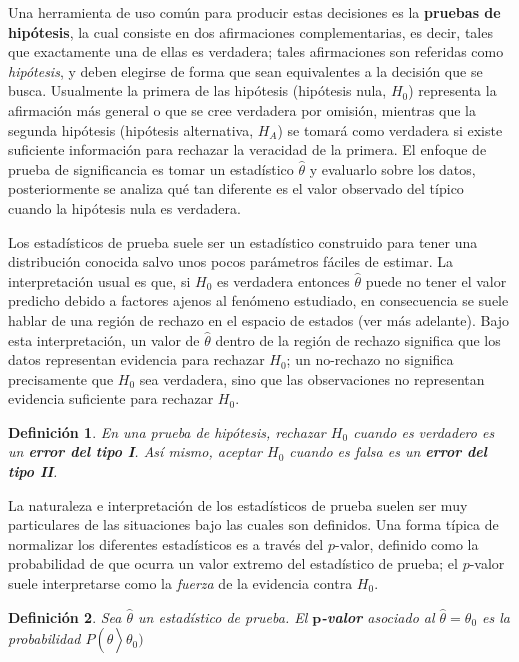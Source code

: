 \documentclass[12pt,letterpaper]{book}
\newtheorem{definicion}{Definición}[chapter]
\newcommand{\est}[1]{\widehat{ #1 }}
\begin{document}
Una herramienta de uso común para producir estas decisiones es la \textbf{pruebas de hipótesis},
la cual consiste en dos afirmaciones complementarias, es decir, tales que exactamente una de ellas es verdadera; tales afirmaciones
son referidas como \textit{hipótesis}, y deben elegirse de forma que sean equivalentes a la 
decisión que se busca. 
%
Usualmente la primera de las hipótesis (hipótesis nula, $H_0$) representa la afirmación más general o que se cree verdadera por omisión, mientras que la segunda hipótesis (hipótesis alternativa, $H_A$) se tomará como verdadera si
existe suficiente información para rechazar la veracidad de la primera.
%
El enfoque de prueba de significancia es  tomar un estadístico $\est{\theta}$ y evaluarlo sobre los datos, posteriormente se analiza qué tan diferente es el valor observado del típico cuando la hipótesis nula es verdadera.

Los estadísticos de prueba suele ser un estadístico construido para tener una distribución conocida salvo unos pocos parámetros fáciles de estimar.
%
La interpretación usual es que, si $H_0$ es verdadera entonces $\est{\theta}$ puede no tener el valor predicho debido a factores ajenos al fenómeno estudiado, en consecuencia se suele hablar de una región de rechazo en el espacio de estados (ver más adelante).
%
Bajo esta interpretación, un valor de $\widehat{\theta}$ dentro de la región de rechazo significa que los datos representan evidencia para rechazar $H_0$; un no-rechazo no significa precisamente que $H_0$ sea verdadera, sino que las observaciones no representan evidencia suficiente para rechazar $H_0$.

\begin{definicion}
En una prueba de hipótesis, rechazar $H_0$ cuando es verdadero es un \textbf{error del tipo I}. Así mismo, aceptar $H_0$ cuando es falsa es un \textbf{error del tipo II}.
\end{definicion}

La naturaleza e interpretación de los estadísticos de prueba suelen ser muy particulares de las situaciones bajo las cuales son definidos.
%
Una forma típica de normalizar los diferentes estadísticos es a través del $p$-valor, definido como la probabilidad de que ocurra un valor extremo del estadístico de prueba; 
el $p$-valor suele interpretarse como la \textit{fuerza} de la evidencia contra $H_0$.

\begin{definicion}
Sea $\widehat{\theta}$ un estadístico de prueba. El \textbf{$\boldsymbol{p}$-valor} asociado al $\widehat{\theta}=\theta_0$ es la probabilidad $P\left(\widehat{\theta}\right>\theta_0)$
\end{definicion}
\end{document}
